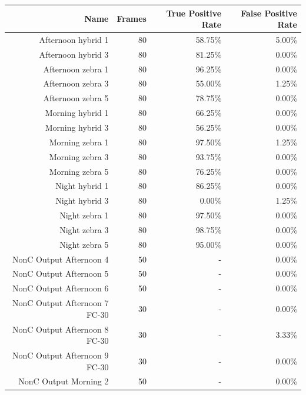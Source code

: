 \documentclass[12pt]{ucthesis}
\begin{document}
    \begin{longtable}{|r|r|r|r|}
    
    \hline
    Name & Frames & True Positive Rate & False Positive Rate \bigstrut\\
    \hline
    Afternoon hybrid 1 & 80 & 58.75\% & 5.00\% \bigstrut\\
    \hline
    Afternoon hybrid 3 & 80 & 81.25\% & 0.00\% \bigstrut\\
    \hline
    Afternoon zebra 1 & 80 & 96.25\% & 0.00\% \bigstrut\\
    \hline
    Afternoon zebra 3 & 80 & 55.00\% & 1.25\% \bigstrut\\
    \hline
    Afternoon zebra 5 & 80 & 78.75\% & 0.00\% \bigstrut\\
    \hline
    Morning hybrid 1 & 80 & 66.25\% & 0.00\% \bigstrut\\
    \hline
    Morning hybrid 3 & 80 & 56.25\% & 0.00\% \bigstrut\\
    \hline
    Morning zebra 1 & 80 & 97.50\% & 1.25\% \bigstrut\\
    \hline
    Morning zebra 3 & 80 & 93.75\% & 0.00\% \bigstrut\\
    \hline
    Morning zebra 5 & 80 & 76.25\% & 0.00\% \bigstrut\\
    \hline
    Night hybrid 1 & 80 & 86.25\% & 0.00\% \bigstrut\\
    \hline
    Night hybrid 3 & 80 & 0.00\% & 1.25\% \bigstrut\\
    \hline
    Night zebra 1 & 80 & 97.50\% & 0.00\% \bigstrut\\
    \hline
    Night zebra 3 & 80 & 98.75\% & 0.00\% \bigstrut\\
    \hline
    Night zebra 5 & 80 & 95.00\% & 0.00\% \bigstrut\\
    \hline
    NonC Output Afternoon 4 & 50 & -  & 0.00\% \bigstrut\\
    \hline
    NonC Output Afternoon 5 & 50 & -  & 0.00\% \bigstrut\\
    \hline
    NonC Output Afternoon 6 & 50 & -  & 0.00\% \bigstrut\\
    \hline
    NonC Output Afternoon 7 FC-30 & 30 & -  & 0.00\% \bigstrut\\
    \hline
    NonC Output Afternoon 8 FC-30 & 30 & -  & 3.33\% \bigstrut\\
    \hline
    NonC Output Afternoon 9 FC-30 & 30 & -  & 0.00\% \bigstrut\\
    \hline
    NonC Output Morning 2 & 50 & -  & 0.00\% \bigstrut\\

\end{longtable}
\end{document}
